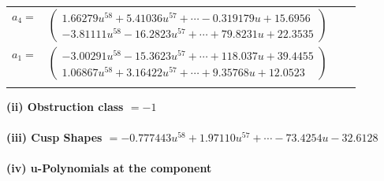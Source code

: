 \documentclass[1p]{elsarticle_modified}
\theoremstyle{definition}
\begin{document}
\begin{tabular}{m{7pt} m{180pt} m{7pt} m{180pt} }
\flushright $a_{4}=$&$\begin{pmatrix}1.66279 u^{58}+5.41036 u^{57}+\cdots-0.319179 u+15.6956\\-3.81111 u^{58}-16.2823 u^{57}+\cdots+79.8231 u+22.3535\end{pmatrix}$ \\
\flushright $a_{1}=$&$\begin{pmatrix}-3.00291 u^{58}-15.3623 u^{57}+\cdots+118.037 u+39.4455\\1.06867 u^{58}+3.16422 u^{57}+\cdots+9.35768 u+12.0523\end{pmatrix}$\\&\end{tabular}
\flushleft \textbf{(ii) Obstruction class $= -1$}\\~\\
\flushleft \textbf{(iii) Cusp Shapes $= -0.777443 u^{58}+1.97110 u^{57}+\cdots-73.4254 u-32.6128$}\\~\\
\newpage\renewcommand{\arraystretch}{1}
\flushleft \textbf{(iv) u-Polynomials at the component}\newline \\
\end{document}
